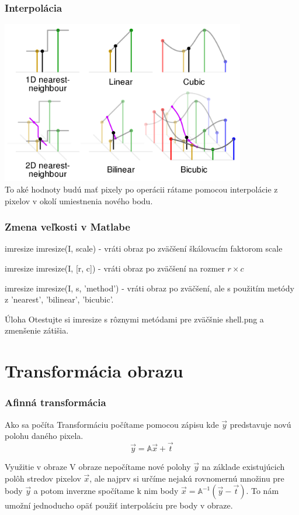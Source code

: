 \documentclass{beamer}
\begin{document}
\begin{frame}
\centering
\frametitle{Interpolácia}
\includegraphics[width=0.8\textwidth]{interpolation.png} \\
To aké hodnoty budú mať pixely po operácii rátame pomocou interpolácie z pixelov v okolí umiestnenia nového bodu.
\end{frame}


\begin{frame}
\centering
\frametitle{Zmena veľkosti v Matlabe}
\begin{block}{imresize}
imresize(I, scale) - vráti obraz po zväčšení škálovacím faktorom scale
\end{block}

\begin{block}{imresize}
imresize(I, [r, c]) - vráti obraz po zväčšení na rozmer $r \times c$
\end{block}

\begin{block}{imresize}
imresize(I, s, 'method') - vráti obraz po zväčšení, ale s použitím metódy z 'nearest', 'bilinear', 'bicubic'.
\end{block}

\begin{block}{Úloha}
Otestujte si imresize s rôznymi metódami pre zväčšnie shell.png a zmenšenie zátišia.
\end{block}
\end{frame}

\section{Transformácia obrazu}

\begin{frame}
\centering
\frametitle{Afinná transformácia}
\begin{block}{Ako sa počíta}
Transformáciu počítame pomocou zápisu kde $\vec{y}$ predstavuje novú polohu daného pixela.
$$ \vec{y} = \mathbb{A}\vec{x} + \vec{t}$$
\end{block}

\begin{alertblock}{Využitie v obraze}
V obraze nepočítame nové polohy $\vec{y}$ na základe existujúcich polôh stredov pixelov $\vec{x}$, ale najprv si určíme nejakú rovnomernú množinu pre body $\vec{y}$ a potom inverzne spočítame k nim body $\vec{x} = \mathbb{A}^{-1} (\vec{y} -\vec{t})$. To nám umožní jednoducho opäť použiť interpoláciu pre body v obraze. 
\end{alertblock}
\end{frame}
\end{document}
